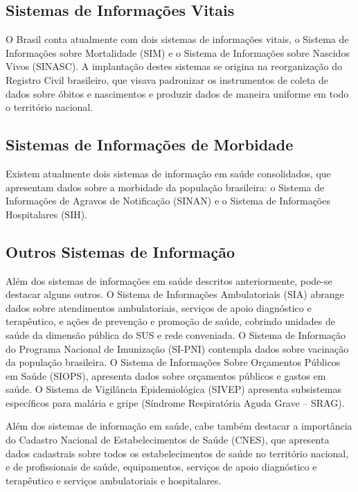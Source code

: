 \documentclass[
  letterpaper,
  DIV=11,
  numbers=noendperiod]{scrreprt}
\begin{document}
\subsection{Sistemas de Informações
Vitais}\label{sistemas-de-informauxe7uxf5es-vitais}

O Brasil conta atualmente com dois sistemas de informações vitais, o
Sistema de Informações sobre Mortalidade (SIM) e o Sistema de
Informações sobre Nascidos Vivos (SINASC). A implantação destes sistemas
se origina na reorganização do Registro Civil brasileiro, que visava
padronizar os instrumentos de coleta de dados sobre óbitos e nascimentos
e produzir dados de maneira uniforme em todo o território nacional.

\subsection{Sistemas de Informações de
Morbidade}\label{sistemas-de-informauxe7uxf5es-de-morbidade}

Existem atualmente dois sistemas de informação em saúde consolidados,
que apresentam dados sobre a morbidade da população brasileira: o
Sistema de Informações de Agravos de Notificação (SINAN) e o Sistema de
Informações Hospitalares (SIH).

\subsection{Outros Sistemas de
Informação}\label{outros-sistemas-de-informauxe7uxe3o}

Além dos sistemas de informações em saúde descritos anteriormente,
pode-se destacar alguns outros. O Sistema de Informações Ambulatoriais
(SIA) abrange dados sobre atendimentos ambulatoriais, serviços de apoio
diagnóstico e terapêutico, e ações de prevenção e promoção de saúde,
cobrindo unidades de saúde da dimensão pública do SUS e rede conveniada.
O Sistema de Informação do Programa Nacional de Imunização (SI-PNI)
contempla dados sobre vacinação da população brasileira. O Sistema de
Informações Sobre Orçamentos Públicos em Saúde (SIOPS), apresenta dados
sobre orçamentos públicos e gastos em saúde. O Sistema de Vigilância
Epidemiológica (SIVEP) apresenta subsistemas específicos para malária e
gripe (Síndrome Respiratória Aguda Grave -- SRAG).

Além dos sistemas de informação em saúde, cabe também destacar a
importância do Cadastro Nacional de Estabelecimentos de Saúde (CNES),
que apresenta dados cadastrais sobre todos os estabelecimentos de saúde
no território nacional, e de profissionais de saúde, equipamentos,
serviços de apoio diagnóstico e terapêutico e serviços ambulatoriais e
hospitalares.
\end{document}
